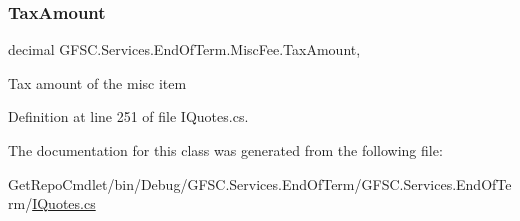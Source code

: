 \subsubsection{\texorpdfstring{Tax\+Amount}{TaxAmount}}
{\footnotesize\ttfamily decimal G\+F\+S\+C.\+Services.\+End\+Of\+Term.\+Misc\+Fee.\+Tax\+Amount\hspace{0.3cm}{\ttfamily [get]}, {\ttfamily [set]}}



Tax amount of the misc item 



Definition at line 251 of file I\+Quotes.\+cs.



The documentation for this class was generated from the following file\+:\begin{DoxyCompactItemize}
\item 
Get\+Repo\+Cmdlet/bin/\+Debug/\+G\+F\+S\+C.\+Services.\+End\+Of\+Term/\+G\+F\+S\+C.\+Services.\+End\+Of\+Term/\mbox{\hyperlink{_i_quotes_8cs}{I\+Quotes.\+cs}}\end{DoxyCompactItemize}
